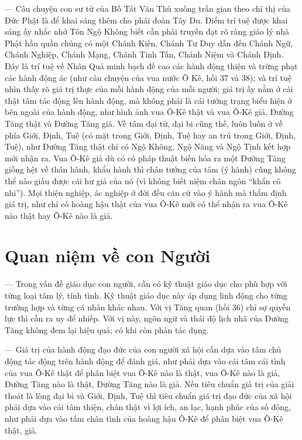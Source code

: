 — Câu chuyện con sư tử của Bồ Tát Văn Thù xuống trần gian theo chỉ thị của Đức Phật là để khai sáng thêm cho phái đoàn Tây Du. Điểm trí tuệ được khai sáng ấy nhắc nhở Tôn Ngộ Không biết cần phải truyền đạt rõ ràng giáo lý nhà Phật hầu quần chúng có một Chánh Kiến, Chánh Tư Duy dẫn đến Chánh Ngữ, Chánh Nghiệp, Chánh Mạng, Chánh Tinh Tấn, Chánh Niệm và Chánh Định. Đây là trí tuệ về Nhân Quả minh bạch đề cao các hành động thiện và trừng phạt các hành động ác (như câu chuyện của vua nước Ô Kê, hồi 37 và 38); và trí tuệ nhìn thấy rõ giá trị thực của mỗi hành động của mỗi người; giá trị ấy nằm ở cái thật tâm tác động lên hành động, mà không phải là cái tướng trạng biểu hiện ở bên ngoài của hành động, như hình ảnh vua Ô-Kê thật và vua Ô-Kê giả, Đường Tăng thật và Đường Tăng giả. Về tâm đại từ, đại bi cũng thế, luôn luôn ở về phía Giới, Định, Tuệ (có mặt trong Giới, Định, Tuệ hay an trú trong Giới, Định, Tuệ), như Đường Tăng thật chỉ có Ngộ Không, Ngộ Năng và Ngộ Tịnh kết hợp mới nhận ra. Vua Ô-Kê giả dù có có pháp thuật biến hóa ra một Đường Tăng giống hệt về thân hành, khẩu hành thì chân tướng của tâm (ý hành) cũng không thể nào giấu được cái hư giả của nó (vì không biết niệm chân ngôn ``khẩn cô nhi''). Mọi thiện nghiệp, ác nghiệp ở đời đều căn cứ vào ý hành mà thẩm định giá trị, như chỉ có hoàng hậu thật của vua Ô-Kê mới có thể nhận ra vua Ô-Kê nào thật hay Ô-Kê nào là giả.

\section{Quan niệm về con Người} %
\label{sec:36_37_con_nguoi}

— Trong vấn đề giáo dục con người, cần có kỹ thuật giáo dục cho phù hợp với từng loại tâm lý, tính tình. Kỹ thuật giáo dục này áp dụng linh động cho từng trường hợp và từng cá nhân khác nhau. Với vị Tăng quan (hồi 36) chỉ sợ quyền lực thì cần ra uy để nhiếp. Với vị này, ngôn ngữ và thái độ lịch nhã của Đường Tăng không đem lại hiệu quả; có khi còn phản tác dụng.

— Giá trị của hành động đạo đức của con người xã hội cần dựa vào tâm chủ động tác động trên hành động để đánh giá, như phải dựa vào cái tâm cái tình của vua Ô-Kê thật để phân biệt vua Ô-Kê nào là thật, vua Ô-Kê nào là giả, Đường Tăng nào là thật, Đường Tăng nào là giả. Nếu tiêu chuẩn giá trị của giải thoát là lòng đại bi và Giới, Định, Tuệ thì tiêu chuẩn giá trị đạo đức của xã hội phải dựa vào cái tâm thiện, chân thật vì lợi ích, an lạc, hạnh phúc của số đông, như phải dựa vào tấm chân tình của hoàng hậu Ô-Kê để phân biệt vua Ô-Kê thật, giả.

